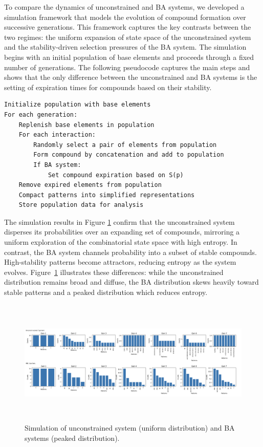 \documentclass[preprint,12pt]{elsarticle}
\begin{document}
To compare the dynamics of unconstrained and BA systems, we developed a simulation framework that models the evolution of compound formation over successive generations. This framework captures the key contrasts between the two regimes: the uniform expansion of state space of the unconstrained system and the stability-driven selection pressures of the BA system. The simulation begins with an initial population of base elements and proceeds through a fixed number of generations. The following pseudocode captures the main steps and shows that the only difference between the unconstrained and BA systems is the setting of expiration times for compounds based on their stability.

\begin{center}
\begin{minipage}{0.9\textwidth}
\ttfamily
\begin{verbatim}
Initialize population with base elements
For each generation:
    Replenish base elements in population
    For each interaction:
        Randomly select a pair of elements from population
        Form compound by concatenation and add to population
        If BA system:
            Set compound expiration based on S(p)
    Remove expired elements from population
    Compact patterns into simplified representations
    Store population data for analysis
\end{verbatim}
\end{minipage}
\end{center}
The simulation results in Figure \ref{fig:figure_4} confirm that the unconstrained system disperses its probabilities over an expanding set of compounds, mirroring a uniform exploration of the combinatorial state space with high entropy. In contrast, the BA system channels probability into a subset of stable compounds. High-stability patterns become attractors, reducing entropy as the system evolves. Figure~\ref{fig:figure_4} illustrates these differences: while the unconstrained distribution remains broad and diffuse, the BA distribution skews heavily toward stable patterns and a peaked distribution which reduces entropy.

\begin{figure}[h]
    \centering
    \includegraphics[width=1\textwidth,height=6cm]{figure_4.png}
    \caption{Simulation of  unconstrained system (uniform distribution) and BA systems (peaked distribution).}
    \label{fig:figure_4}
 \end{figure}
\end{document}
